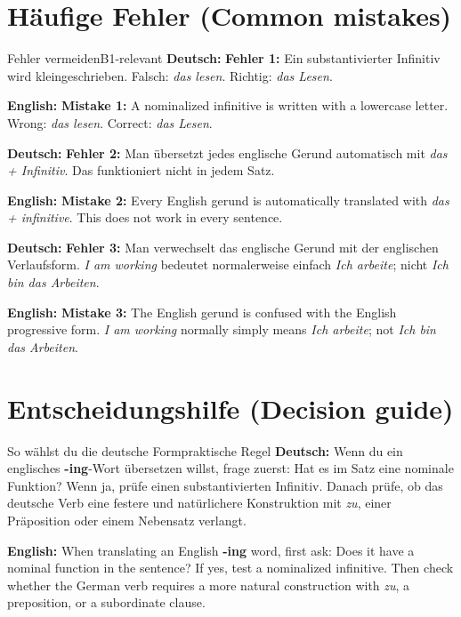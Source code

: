 \documentclass[a4paper,11pt]{article}
\newcommand{\GermanText}[1]{\textbf{Deutsch: }#1\par}
\newcommand{\EnglishText}[1]{{\small\color{SoftGray}\textbf{English: }#1\par}}
\begin{document}
\section{Häufige Fehler \textnormal{(Common mistakes)}}
\begin{grammarentry}{Fehler vermeiden}{B1-relevant}
\GermanText{\textbf{Fehler 1:} Ein substantivierter Infinitiv wird kleingeschrieben. Falsch: \textit{das lesen}. Richtig: \textit{das Lesen}.}
\EnglishText{\textbf{Mistake 1:} A nominalized infinitive is written with a lowercase letter. Wrong: \textit{das lesen}. Correct: \textit{das Lesen}.}

\GermanText{\textbf{Fehler 2:} Man übersetzt jedes englische Gerund automatisch mit \textit{das + Infinitiv}. Das funktioniert nicht in jedem Satz.}
\EnglishText{\textbf{Mistake 2:} Every English gerund is automatically translated with \textit{das + infinitive}. This does not work in every sentence.}

\GermanText{\textbf{Fehler 3:} Man verwechselt das englische Gerund mit der englischen Verlaufsform. \textit{I am working} bedeutet normalerweise einfach \textit{Ich arbeite}; nicht \textit{Ich bin das Arbeiten}.}
\EnglishText{\textbf{Mistake 3:} The English gerund is confused with the English progressive form. \textit{I am working} normally simply means \textit{Ich arbeite}; not \textit{Ich bin das Arbeiten}.}
\end{grammarentry}

\section{Entscheidungshilfe \textnormal{(Decision guide)}}
\begin{grammarentry}{So wählst du die deutsche Form}{praktische Regel}
\GermanText{Wenn du ein englisches \textbf{-ing}-Wort übersetzen willst, frage zuerst: Hat es im Satz eine nominale Funktion? Wenn ja, prüfe einen substantivierten Infinitiv. Danach prüfe, ob das deutsche Verb eine festere und natürlichere Konstruktion mit \textit{zu}, einer Präposition oder einem Nebensatz verlangt.}
\EnglishText{When translating an English \textbf{-ing} word, first ask: Does it have a nominal function in the sentence? If yes, test a nominalized infinitive. Then check whether the German verb requires a more natural construction with \textit{zu}, a preposition, or a subordinate clause.}
\end{grammarentry}
\end{document}

